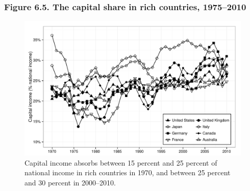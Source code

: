 \documentclass[t]{beamer}\usepackage[]{graphicx}\usepackage[]{color}
\newenvironment{knitrout}{}{} %
\begin{document}
\begin{frame}[label=Figure_6_5]
\frametitle{Figure 6.5. The capital share in rich countries, 1975--2010}
\begin{figure}[t]
\begin{minipage}[b]{\textwidth}
\centering
\begin{knitrout}\footnotesize
{}\color{fgcolor}

{\centering \includegraphics[width=1\linewidth]{figures/bw/Figure_6_5} 

}



\end{knitrout}
\caption{Capital income absorbs between 15 percent and 25 percent of national income in rich countries in 1970, and between 25 percent and 30 percent in 2000--2010.}
\end{minipage}
\end{figure}
\end{frame}
\end{document}
